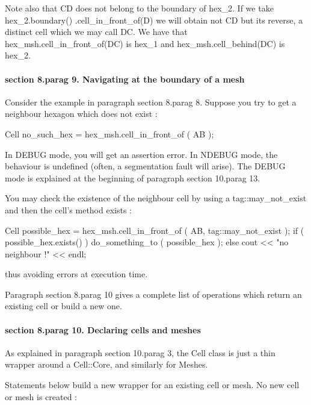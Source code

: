 Note also that {\codett CD} does not belong to the boundary of {\codett hex\_2}.
If we take {\codett hex\_2.boundary() .cell\_in\_front\_of(D)} we will obtain not
{\codett CD} but its reverse, a distinct cell which we may call {\codett DC}.
We have that {\codett hex\_msh.cell\_in\_front\_of(DC)} is {\codett hex\_1} and
{\codett hex\_msh.cell\_behind(DC)} is {\codett hex\_2}.


\paragraph{\numb section 8.\numb parag 9. Navigating at the boundary of a mesh}

Consider the example in paragraph \numb section 8.\numb parag 8.
Suppose you try to get a neighbour hexagon which does not exist :

\verbatim
   Cell no_such_hex = hex_msh.cell_in_front_of ( AB );
\endverbatim

In {\codett DEBUG} mode, you will get an {\codett assertion error}.
In {\codett NDEBUG} mode, the behaviour is undefined
(often, a {\codett segmentation fault} will arise).
The {\codett DEBUG} mode is explained at the beginning of paragraph \numb section
10.\numb parag 13.

You may check the existence of the neighbour cell by using a
{\codett tag::may\_not\_exist} and then the cell's method {\codett exists} :

\verbatim
   Cell possible_hex = hex_msh.cell_in_front_of ( AB, tag::may_not_exist );
   if ( possible_hex.exists() ) do_something_to ( possible_hex );
   else cout << "no neighbour !" << endl;
\endverbatim

\noindent thus avoiding errors at execution time.

Paragraph \numb section 8.\numb parag 10 gives a complete list of operations which return
an existing cell or build a new one.


\paragraph{\numb section 8.\numb parag 10. Declaring cells and meshes}

As explained in paragraph \numb section 10.\numb parag 3, the {\codett Cell} class
is just a thin wrapper around a {\codett Cell::Core}, and similarly for {\codett Mesh}es.

Statements below build a new wrapper for an existing cell or mesh.
No new cell or mesh is created :

